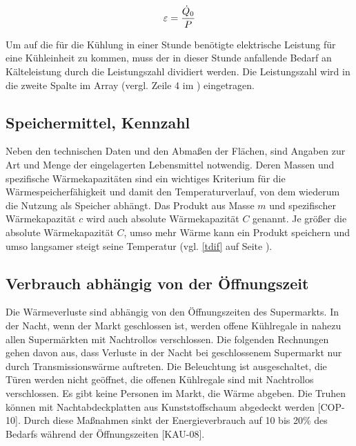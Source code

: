 \begin{equation}
	\epsilon = \frac{\pkalt}{P}
\label{epsilon}
\end{equation}

\noindent Um auf die für die Kühlung in einer Stunde benötigte elektrische Leistung für eine Kühleinheit zu kommen, muss der
in dieser Stunde anfallende Bedarf an Kälteleistung durch die Leistungszahl dividiert werden. Die Leistungszahl wird in die
zweite Spalte im Array (vergl. Zeile 4 im ) eingetragen.

\subsection{Speichermittel, Kennzahl}

Neben den technischen Daten und den Abmaßen der Flächen, sind Angaben zur Art und Menge der eingelagerten Lebensmittel
notwendig. Deren Massen und spezifische Wärmekapazitäten sind ein wichtiges Kriterium für die Wärmespeicherfähigkeit und
damit den Temperaturverlauf, von dem wiederum die Nutzung als Speicher abhängt. Das Produkt aus Masse $m$ und spezifischer
Wärmekapazität $c$ wird auch absolute Wärmekapazität $C$ genannt. Je größer die absolute Wärmekapazität $C$, umso mehr Wärme
kann ein Produkt speichern und umso langsamer steigt seine Temperatur (vgl. \cref{tdif} auf Seite ).

\subsection{Verbrauch abhängig von der Öffnungszeit}

Die Wärmeverluste sind abhängig von den Öffnungszeiten des Supermarkts. In der Nacht, wenn der Markt geschlossen ist, werden
offene Kühlregale in nahezu allen Supermärkten mit Nachtrollos verschlossen. Die folgenden Rechnungen gehen davon aus, dass
Verluste in der Nacht bei geschlossenem Supermarkt nur durch Transmissionswärme auftreten. Die Beleuchtung ist ausgeschaltet,
die Türen werden nicht geöffnet, die offenen Kühlregale sind mit Nachtrollos verschlossen. Es gibt keine Personen im Markt, die
Wärme abgeben. Die Truhen können mit Nachtabdeckplatten aus Kunststoffschaum abgedeckt werden [COP-10]. Durch diese Maßnahmen
sinkt der Energieverbrauch auf 10 bis 20\% des Bedarfs während der Öffnungszeiten [KAU-08].

